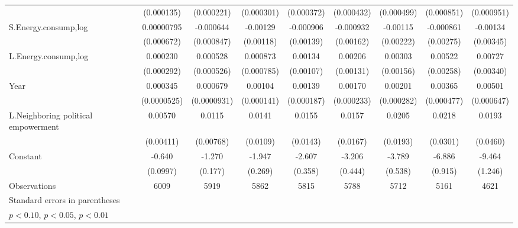 \begin{table}[htbp]
\begin{tabular}{l*{8}{c}}
                    &  (0.000135)         &  (0.000221)         &  (0.000301)         &  (0.000372)         &  (0.000432)         &  (0.000499)         &  (0.000851)         &  (0.000951)         \\
[1em]
S.Energy.consump,log&  0.00000795         &   -0.000644         &    -0.00129         &   -0.000906         &   -0.000932         &    -0.00115         &   -0.000861         &    -0.00134         \\
                    &  (0.000672)         &  (0.000847)         &   (0.00118)         &   (0.00139)         &   (0.00162)         &   (0.00222)         &   (0.00275)         &   (0.00345)         \\
[1em]
L.Energy.consump,log&    0.000230         &    0.000528         &    0.000873         &     0.00134         &     0.00206         &     0.00303\sym{*}  &     0.00522\sym{**} &     0.00727\sym{**} \\
                    &  (0.000292)         &  (0.000526)         &  (0.000785)         &   (0.00107)         &   (0.00131)         &   (0.00156)         &   (0.00258)         &   (0.00340)         \\
[1em]
Year                &    0.000345\sym{***}&    0.000679\sym{***}&     0.00104\sym{***}&     0.00139\sym{***}&     0.00170\sym{***}&     0.00201\sym{***}&     0.00365\sym{***}&     0.00501\sym{***}\\
                    & (0.0000525)         & (0.0000931)         &  (0.000141)         &  (0.000187)         &  (0.000233)         &  (0.000282)         &  (0.000477)         &  (0.000647)         \\
[1em]
L.Neighboring political empowerment&     0.00570         &      0.0115         &      0.0141         &      0.0155         &      0.0157         &      0.0205         &      0.0218         &      0.0193         \\
                    &   (0.00411)         &   (0.00768)         &    (0.0109)         &    (0.0143)         &    (0.0167)         &    (0.0193)         &    (0.0301)         &    (0.0460)         \\
[1em]
Constant            &      -0.640\sym{***}&      -1.270\sym{***}&      -1.947\sym{***}&      -2.607\sym{***}&      -3.206\sym{***}&      -3.789\sym{***}&      -6.886\sym{***}&      -9.464\sym{***}\\
                    &    (0.0997)         &     (0.177)         &     (0.269)         &     (0.358)         &     (0.444)         &     (0.538)         &     (0.915)         &     (1.246)         \\
\hline
Observations        &        6009         &        5919         &        5862         &        5815         &        5788         &        5712         &        5161         &        4621         \\
\hline\hline
\multicolumn{9}{l}{\footnotesize Standard errors in parentheses}\\
\multicolumn{9}{l}{\footnotesize \sym{*} \(p<0.10\), \sym{**} \(p<0.05\), \sym{***} \(p<0.01\)}\\
\end{tabular}
\end{table}
